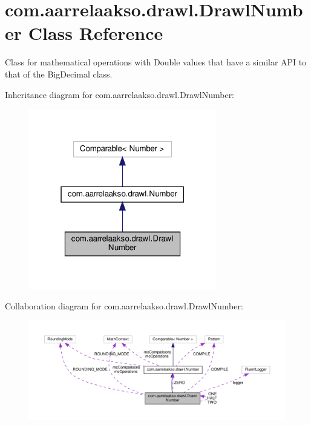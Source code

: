 \hypertarget{classcom_1_1aarrelaakso_1_1drawl_1_1_drawl_number}{}\section{com.\+aarrelaakso.\+drawl.\+Drawl\+Number Class Reference}
\label{classcom_1_1aarrelaakso_1_1drawl_1_1_drawl_number}


Class for mathematical operations with Double values that have a similar A\+PI to that of the Big\+Decimal class.  




Inheritance diagram for com.\+aarrelaakso.\+drawl.\+Drawl\+Number\+:
\nopagebreak
\begin{figure}[H]
\begin{center}
\leavevmode
\includegraphics[width=232pt]{d2/dc2/classcom_1_1aarrelaakso_1_1drawl_1_1_drawl_number__inherit__graph}
\end{center}
\end{figure}


Collaboration diagram for com.\+aarrelaakso.\+drawl.\+Drawl\+Number\+:
\nopagebreak
\begin{figure}[H]
\begin{center}
\leavevmode
\includegraphics[width=350pt]{dd/d28/classcom_1_1aarrelaakso_1_1drawl_1_1_drawl_number__coll__graph}
\end{center}
\end{figure}
